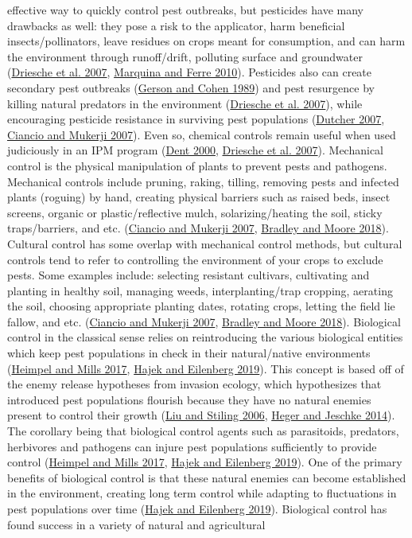 \documentclass[12pt,final,CPage]{ufthesis}
\begin{document}
{effective way to quickly control pest outbreaks, but pesticides have many drawbacks as well: they pose a risk to the applicator, harm beneficial insects/pollinators, leave residues on crops meant for consumption, and can harm the environment through runoff/drift, polluting surface and groundwater (\protect\hyperlink{ref-Driesche2007}{Driesche et al. 2007}, \protect\hyperlink{ref-Marquina2010}{Marquina and Ferre 2010}). Pesticides also can create secondary pest outbreaks (\protect\hyperlink{ref-Gerson1989}{Gerson and Cohen 1989}) and pest resurgence by killing natural predators in the environment (\protect\hyperlink{ref-Driesche2007}{Driesche et al. 2007}), while encouraging pesticide resistance in surviving pest populations (\protect\hyperlink{ref-Dutcher2007}{Dutcher 2007}, \protect\hyperlink{ref-Ciancio2007}{Ciancio and Mukerji 2007}). Even so, chemical controls remain useful when used judiciously in an IPM program (\protect\hyperlink{ref-Dent2000}{Dent 2000}, \protect\hyperlink{ref-Driesche2007}{Driesche et al. 2007}). Mechanical control is the physical manipulation of plants to prevent pests and pathogens. Mechanical controls include pruning, raking, tilling, removing pests and infected plants (roguing) by hand, creating physical barriers such as raised beds, insect screens, organic or plastic/reflective mulch, solarizing/heating the soil, sticky traps/barriers, and etc. (\protect\hyperlink{ref-Ciancio2007}{Ciancio and Mukerji 2007}, \protect\hyperlink{ref-Bradley2018}{Bradley and Moore 2018}). Cultural control has some overlap with mechanical control methods, but cultural controls tend to refer to controlling the environment of your crops to exclude pests. Some examples include: selecting resistant cultivars, cultivating and planting in healthy soil, managing weeds, interplanting/trap cropping, aerating the soil, choosing appropriate planting dates, rotating crops, letting the field lie fallow, and etc. (\protect\hyperlink{ref-Ciancio2007}{Ciancio and Mukerji 2007}, \protect\hyperlink{ref-Bradley2018}{Bradley and Moore 2018}). Biological control in the classical sense relies on reintroducing the various biological entities which keep pest populations in check in their natural/native environments (\protect\hyperlink{ref-Heimpel2017}{Heimpel and Mills 2017}, \protect\hyperlink{ref-Hajek2019}{Hajek and Eilenberg 2019}). This concept is based off of the enemy release hypotheses from invasion ecology, which hypothesizes that introduced pest populations flourish because they have no natural enemies present to control their growth (\protect\hyperlink{ref-Liu2006}{Liu and Stiling 2006}, \protect\hyperlink{ref-Heger2014}{Heger and Jeschke 2014}). The corollary being that biological control agents such as parasitoids, predators, herbivores and pathogens can injure pest populations sufficiently to provide control (\protect\hyperlink{ref-Heimpel2017}{Heimpel and Mills 2017}, \protect\hyperlink{ref-Hajek2019}{Hajek and Eilenberg 2019}). One of the primary benefits of biological control is that these natural enemies can become established in the environment, creating long term control while adapting to fluctuations in pest populations over time (\protect\hyperlink{ref-Hajek2019}{Hajek and Eilenberg 2019}). Biological control has found success in a variety of natural and agricultural }
\end{document}
